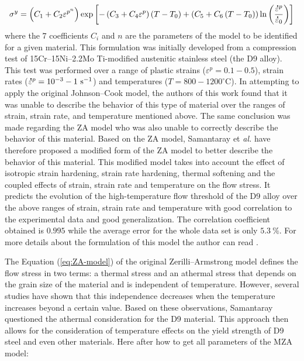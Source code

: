 \documentclass[twoside,english,1p,final,sort&compress]{elsarticle}
\makeatletter
\theoremstyle{plain}
\newcommand{\mdot}[1]{\accentset{\mbox{\bfseries .}}{#1}}
\newcommand*{\eal}{et \emph{al.}\@\xspace}
\makeatother
\begin{document}
\begin{equation}
\label{eq:MZA-model}
\sigma^y = \left(C_{1}+C_{2}\varepsilon^{p^n}\right) \exp\left[-\left(C_{3}+C_{4}\varepsilon^p\right)\left(T-T_0\right) + \left(C_{5}+C_{6}\left(T-T_0\right)\right)\ln\left( \frac{\mdot{\varepsilon}^p}{\mdot{\varepsilon}_0}\right)\right]
\end{equation}
where the $7$ coefficients $C_i$ and $n$ are the parameters of the model to be identified for a given material. This formulation was initially developed from a compression test of 15Cr--15Ni--2.2Mo Ti-modified austenitic stainless steel (the D9 alloy). This test was performed over a range of plastic strains ($\varepsilon^p=0.1-0.5$), strain rates ($\mdot{\varepsilon}^p=10^{-3}-1~\text{s}^{-1}$) and temperatures ($T=800-1200^\circ\text{C}$). In attempting to apply the original Johnson--Cook model, the authors of this work found that it was unable to describe the behavior of this type of material over the ranges of strain, strain rate, and temperature mentioned above. The same conclusion was made regarding the ZA model who was also unable to correctly describe the behavior of this material. Based on the ZA model, Samantaray \eal \cite{Samantaray-2009-Thermo-viscoplastic} have therefore proposed a modified form of the ZA model to better describe the behavior of this material. This modified model takes into account the effect of isotropic strain hardening, strain rate hardening, thermal softening and the coupled effects of strain, strain rate and temperature on the flow stress. It predicts the evolution of the high-temperature flow threshold of the D9 alloy over the above ranges of strain, strain rate and temperature with good correlation to the experimental data and good generalization. The correlation coefficient obtained is $0.995$ while the average error for the whole data set is only $5.3~\%$. For more details about the formulation of this model the author can read \cite{Samantaray-2009-Thermo-viscoplastic}.

The Equation (\ref{eq:ZA-model}) of the original Zerilli--Armstrong model defines the flow stress in two terms: a thermal stress and an athermal stress that depends on the grain size of the material and is independent of temperature. However, several studies have shown that this independence decreases when the temperature increases beyond a certain value. Based on these observations, Samantaray questioned the athermal consideration for the D9 material. This approach then allows for the consideration of temperature effects on the yield strength of D9 steel and even other materials. Here after how to get all parameters of the MZA model:
\end{document}
